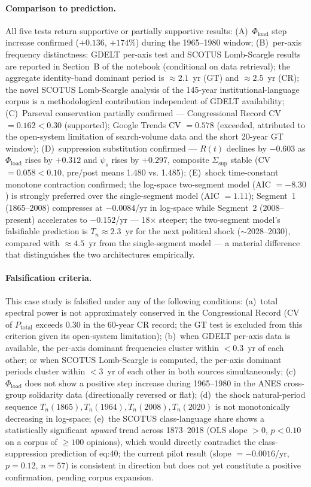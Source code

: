 \paragraph{Comparison to prediction.}
All five tests return supportive or partially supportive results:
(A)~$\Phi_{\text{load}}$ step increase confirmed ($+0.136$, $+174\%$) during the
1965--1980 window;
(B)~per-axis frequency distinctness: GDELT per-axis test and SCOTUS Lomb-Scargle
results are reported in Section~B of the notebook (conditional on data retrieval);
the aggregate identity-band dominant period is ${\approx}2.1$~yr (GT) and
${\approx}2.5$~yr (CR); the novel SCOTUS Lomb-Scargle analysis of the 145-year
institutional-language corpus is a methodological contribution independent of GDELT
availability;
(C)~Parseval conservation partially confirmed --- Congressional Record CV $= 0.162 < 0.30$
(supported); Google Trends CV $= 0.578$ (exceeded, attributed to the open-system
limitation of search-volume data and the short 20-year GT window);
(D)~suppression substitution confirmed --- $R(t)$ declines by $-0.603$
as $\Phi_{\text{load}}$ rises by $+0.312$ and $\psi_s$ rises by $+0.297$,
composite $\Sigma_{\text{sup}}$ stable (CV $= 0.058 < 0.10$, pre/post means 1.480 vs. 1.485);
(E)~shock time-constant monotone contraction confirmed; the log-space two-segment model
(AIC $= {-8.30}$) is strongly preferred over the single-segment model (AIC $= 1.11$);
Segment~1 (1865--2008) compresses at $-0.0084$/yr in log-space while Segment~2
(2008--present) accelerates to $-0.152$/yr --- 18$\times$ steeper; the two-segment
model's falsifiable prediction is $T_n \approx 2.3$~yr for the next political shock
(${\sim}$2028--2030), compared with ${\approx}4.5$~yr from the single-segment model ---
a material difference that distinguishes the two architectures empirically.

\paragraph{Falsification criteria.}
This case study is falsified under any of the following conditions:
(a)~total spectral power is not approximately conserved in the Congressional Record
(CV of $P_{\text{total}}$ exceeds 0.30 in the 60-year CR record; the GT
test is excluded from this criterion given its open-system limitation);
(b)~when GDELT per-axis data is available, the per-axis dominant frequencies
cluster within $< 0.3$~yr of each other; or when SCOTUS Lomb-Scargle is computed,
the per-axis dominant periods cluster within $< 3$~yr of each other in both
sources simultaneously;
(c)~$\Phi_{\text{load}}$ does not show a positive step increase during 1965--1980 in
the ANES cross-group solidarity data (directionally reversed or flat);
(d)~the shock natural-period sequence $T_n(1865), T_n(1964), T_n(2008), T_n(2020)$ is
not monotonically decreasing in log-space;
(e)~the SCOTUS class-language share shows a statistically significant \textit{upward}
trend across 1873--2018 (OLS slope $> 0$, $p < 0.10$ on a corpus of $\geq 100$ opinions),
which would directly contradict the class-suppression prediction of eq:40; the current
pilot result (slope $= {-0.0016}$/yr, $p = 0.12$, $n = 57$) is consistent in direction
but does not yet constitute a positive confirmation, pending corpus expansion.

